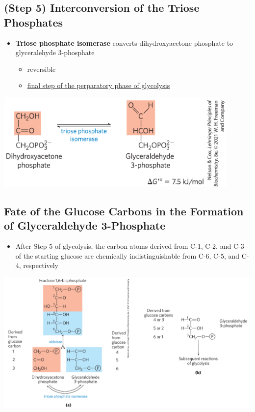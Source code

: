 \documentclass[10pt]{article}
\begin{document}
\subsection*{(Step 5) Interconversion of the Triose Phosphates}
\begin{itemize}
	\item \textbf{Triose phosphate isomerase} converts dihydroxyacetone phosphate to glyceralehyde 3-phosphate
	\begin{itemize}
        \item reversible
        \item \underline{final step of the perparatory phase of glycolysis}
    \end{itemize}
\end{itemize}
\begin{center} 
	\includegraphics*[width=0.9\textwidth]{L1_10.png}
\end{center}

\subsection*{Fate of the Glucose Carbons in the Formation of Glyceraldehyde 3-Phosphate}
\begin{itemize}
	\item After Step 5 of glycolysis, the carbon atoms derived from C-1, C-2, and C-3 of the starting glucose are chemically indistinguishable from C-6, C-5, and C-4, respectively
\end{itemize}
\begin{center} 
	\includegraphics*[width=\textwidth]{L1_11.png}
\end{center}
\end{document}
